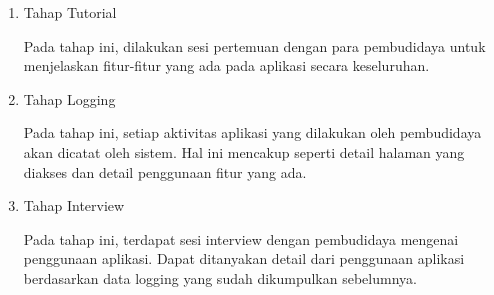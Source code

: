 \begin{enumerate}
	\begin{enumerate}
		\item Tahap Tutorial
		
		Pada tahap ini, dilakukan sesi pertemuan dengan para pembudidaya untuk menjelaskan fitur-fitur yang ada pada aplikasi secara keseluruhan.

		\item Tahap Logging
		
		Pada tahap ini, setiap aktivitas aplikasi yang dilakukan oleh pembudidaya akan dicatat oleh sistem. Hal ini mencakup seperti detail halaman yang diakses dan detail penggunaan fitur yang ada.
	
		\item Tahap Interview
		
		Pada tahap ini, terdapat sesi interview dengan pembudidaya mengenai penggunaan aplikasi. Dapat ditanyakan detail dari penggunaan aplikasi berdasarkan data logging yang sudah dikumpulkan sebelumnya.
	\end{enumerate}

	


\end{enumerate}
